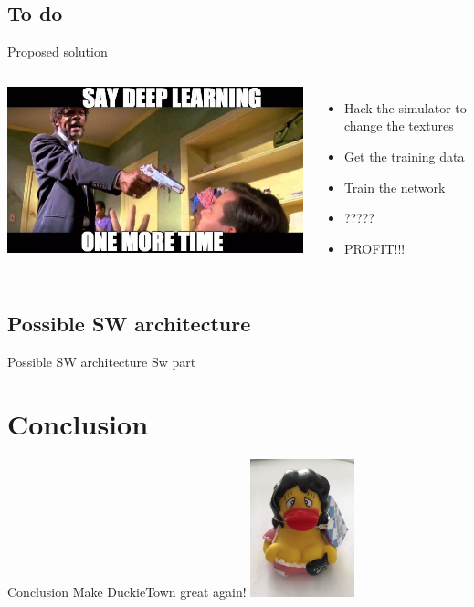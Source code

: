 \documentclass{beamer}
\begin{document}
    \subsection{To do}
    \begin{frame}{Proposed solution}

    \pause

    \begin{columns}

        \includegraphics[width=\textwidth]{fig/meme.jpeg}\pause


    \begin{itemize}
        \item Hack the simulator to change the textures\pause
        \item Get the training data\pause
        \item Train the network\pause
        \item ?????\pause
        \item PROFIT!!!\pause
    \end{itemize}
    \end{columns}
    \end{frame}

    \subsection{Possible SW architecture}
    \begin{frame}{Possible SW architecture}
    Sw part
    \end{frame}


\section{Conclusion}
\begin{frame}{Conclusion}
    \Huge \center Make DuckieTown great again!
    \includegraphics[height=4cm]{fig/duckie.jpg}
\end{frame}
\end{document}
